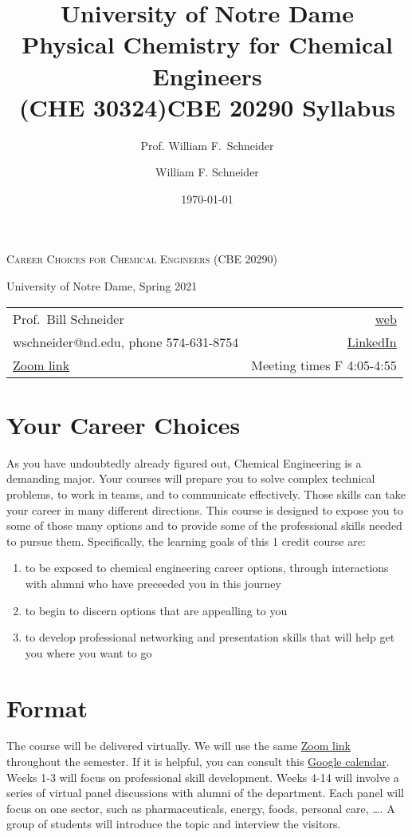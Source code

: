 \documentclass[11pt]{article}
\title{University of Notre Dame\\Physical Chemistry for Chemical Engineers\\(CHE 30324)}
\author{Prof. William F.\ Schneider}
\author{William F. Schneider}
\date{\today}
\title{CBE 20290  Syllabus}
\begin{document}
\begin{OPTIONS}
\end{OPTIONS}

\begin{center}
\textsc{Career Choices for Chemical Engineers (CBE 20290)}

University of Notre Dame, Spring 2021
\end{center}

\begin{center}
\begin{tabular}{lr}
\hline
Prof.~Bill Schneider & \href{https://www.nd.edu/\~wschnei1}{web}\\
wschneider@nd.edu, phone 574-631-8754 & \href{https://www.linkedin.com/in/william-schneider-570091a/}{LinkedIn}\\
\href{https://notredame.zoom.us/j/91572218330?pwd=WFFvRW9DU3UvMHhXUTBwQUNIZzd0dz09}{Zoom link} & Meeting times F 4:05-4:55\\
\hline
\end{tabular}
\end{center}

\section{Your Career Choices}
\label{sec:org989ffc2}
As you have undoubtedly already figured out, Chemical Engineering is a demanding major. Your courses will prepare you to solve complex technical problems, to work in teams, and to communicate effectively.  Those skills can take your career in many different directions. This course is designed to expose you to some of those many options and to provide some of the professional skills needed to pursue them. Specifically, the learning goals of this 1 credit course are:

\begin{enumerate}
\item to be exposed to chemical engineering career options, through interactions with alumni who have preceeded you in this journey
\item to begin to discern options that are appealling to you
\item to develop  professional networking and presentation skills that will help get you where you want to go
\end{enumerate}

\section{Format}
\label{sec:org654d2e4}
The course will be delivered virtually. We will use the same \href{https://notredame.zoom.us/j/91572218330?pwd=WFFvRW9DU3UvMHhXUTBwQUNIZzd0dz09}{Zoom link} throughout the semester. If it is helpful, you can consult this \href{https://calendar.google.com/calendar/u/0?cid=Y183NG02cDJnYWQ2NDQ4OTUzZGthaHJia2Nnc0Bncm91cC5jYWxlbmRhci5nb29nbGUuY29t}{Google calendar}.  Weeks 1-3 will focus on professional skill development. Weeks 4-14 will involve a series of virtual panel discussions with alumni of the department. Each panel will focus on one sector, such as pharmaceuticals, energy, foods, personal care, \ldots.  A group of students will introduce the topic and interview the visitors.
\end{document}
